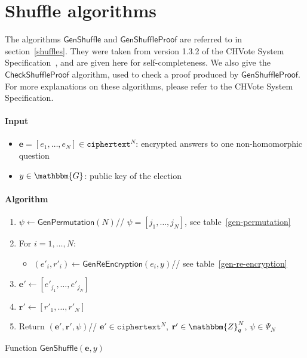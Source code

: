 \documentclass[a4paper]{article}
\newcommand{\G}{\mathbbm{G}}
\newcommand{\Z}{\mathbbm{Z}}
\begin{document}
\section{Shuffle algorithms}
\label{shuffle-algorithms}

The algorithms $\textsf{GenShuffle}$ and $\textsf{GenShuffleProof}$
are referred to in section~\ref{shuffles}. They were taken from
version 1.3.2 of the CHVote System
Specification~\cite{CHVote},
and
are given here for self-completeness. We also give the
$\textsf{CheckShuffleProof}$ algorithm, used to check a proof produced
by $\textsf{GenShuffleProof}$. For more explanations on these
algorithms, please refer to the CHVote System Specification.

\begin{table}
  \begin{framed}
    \noindent\paragraph{Input}
    \begin{itemize}
    \item $\textbf{e}=[e_1,\dots,e_N]\in\texttt{ciphertext}^N$:
      encrypted answers to one non-homomorphic question
    \item $y\in\G$: public key of the election
    \end{itemize}
    \noindent\paragraph{Algorithm}
    \begin{enumerate}
    \item $\psi\leftarrow\textsf{GenPermutation}(N)$\hfill//
      $\psi=[j_1,\dots,j_N]$, see table~\ref{gen-permutation}
    \item For $i=1,\dots,N$:
      \begin{itemize}
      \item
        $(e'_i,r'_i)\leftarrow\textsf{GenReEncryption}(e_i,y)$\hfill//
        see table~\ref{gen-re-encryption}
      \end{itemize}
    \item $\textbf{e}'\leftarrow[e'_{j_1},\dots,e'_{j_N}]$
    \item $\textbf{r}'\leftarrow[r'_1,\dots,r'_N]$
    \item Return $(\textbf{e}',\textbf{r}',\psi)$\hfill//
      $\textbf{e}'\in\texttt{ciphertext}^N$, $\textbf{r}'\in\Z_q^N$,
      $\psi\in\Psi_N$
    \end{enumerate}
  \end{framed}
  \caption{Function $\mathsf{GenShuffle}(\textbf{e},y)$}
  \label{gen-shuffle}
\end{table}
\end{document}
